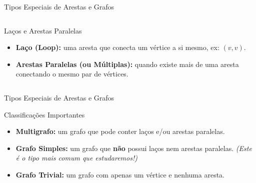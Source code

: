 \documentclass[xcolor=table]{beamer}
\begin{document}
\begin{frame}{Tipos Especiais de Arestas e Grafos}
  \begin{columns}
    \begin{block}{Laços e Arestas Paralelas}
      \begin{itemize}
        \item \textbf{Laço (Loop):} uma aresta que conecta um vértice a si mesmo, ex: $(v,v)$.
        \item \textbf{Arestas Paralelas (ou Múltiplas):} quando existe mais de uma aresta conectando o mesmo par de vértices.
      \end{itemize}
    \end{block}
    \centering
  \end{columns}
\end{frame}

\begin{frame}{Tipos Especiais de Arestas e Grafos}
  \begin{block}{Classificações Importantes}
    \begin{itemize}
      \item \textbf{Multigrafo:} um grafo que pode conter laços e/ou arestas paralelas.
      \item \textbf{Grafo Simples:} um grafo que \textbf{não} possui laços nem arestas paralelas. \textit{(Este é o tipo mais comum que estudaremos!)}
      \item \textbf{Grafo Trivial:} um grafo com apenas um vértice e nenhuma aresta.
    \end{itemize}
  \end{block}
\end{frame}
\end{document}
